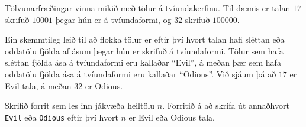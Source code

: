 
Tölvunarfræðingar vinna mikið með tölur á tvíundakerfinu. Til dæmis er talan
$17$ skrifuð $10001$ þegar hún er á tvíundaformi, og $32$ skrifuð $100000$.

Ein skemmtileg leið til að flokka tölur er eftir því hvort talan hafi sléttan
eða oddatölu fjölda af ásum þegar hún er skrifuð á tvíundaformi. Tölur sem hafa
sléttan fjölda ása á tvíundaformi eru kallaðar ``Evil'', á meðan þær sem hafa
oddatölu fjölda ása á tvíundaformi eru kallaðar ``Odious''. Við sjáum þá að
$17$ er Evil tala, á meðan $32$ er Odious.

Skrifið forrit sem les inn jákvæða heiltölu $n$. Forritið á að skrifa út annaðhvort
\texttt{Evil} eða \texttt{Odious} eftir því hvort $n$ er Evil eða Odious tala.


